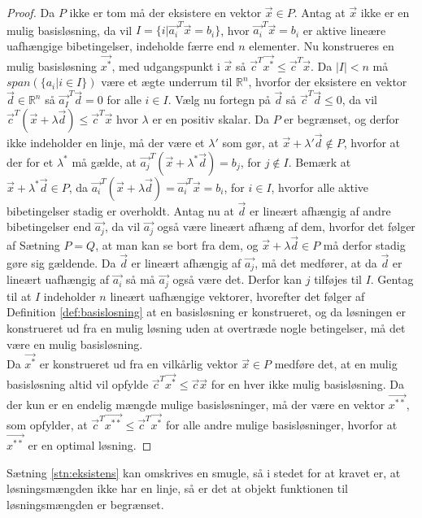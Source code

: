 \begin{proof}
Da $P$ ikke er tom må der eksistere en vektor $\vec{x} \in P$.
Antag at $\vec{x}$ ikke er en mulig basisløsning, da vil $I = \{i | \vec{a_i}^T\vec{x} = b_i\}$, hvor $\vec{a_i}^T\vec{x}=b_i$ er aktive lineære uafhængige bibetingelser, indeholde færre end $n$ elementer. 
Nu konstrueres en mulig basisløsning $\vec{x^*}$, med udgangspunkt i $\vec{x}$ så $\vec{c}^T\vec{x^*}\leq \vec{c}^T\vec{x}$.
Da $|I|<n $ må $span(\{a_i | i \in I\})$ være et ægte underrum til $\mathds{R}^n$, hvorfor der eksistere en vektor $\vec{d} \in \mathds{R}^n$ så $\vec{a_I}^T\vec{d}=0$ for alle $i \in I$. 
Vælg nu fortegn på $\vec{d}$ så $\vec{c}^T\vec{d} \leq 0$, da vil $\vec{c}^T(\vec{x}+\lambda\vec{d}) \leq \vec{c}^T\vec{x}$ hvor $\lambda$ er en positiv skalar.
Da $P$ er begrænset, og derfor ikke indeholder en linje, må der være et $\lambda'$ som gør, at $\vec{x}+\lambda'\vec{d} \notin P$, hvorfor at der for et $\lambda^*$ må gælde, at $\vec{a_j}^T(\vec{x}+\lambda^* \vec{d}) = b_j$, for $j \notin I$.
Bemærk at $\vec{x}+\lambda^*\vec{d} \in P$, da $\vec{a_i}^T(\vec{x}+\lambda\vec{d})= \vec{a_i}^T\vec{x} = b_i$, for $i \in I$, hvorfor alle aktive bibetingelser stadig er overholdt.
Antag nu at $\vec{d}$ er lineært afhængig af andre bibetingelser end $\vec{a_j}$, da vil $\vec{a_j}$ også være lineært afhæng af dem, hvorfor det følger af Sætning $P=Q$, at man kan se bort fra dem, og $\vec{x}+\lambda \vec{d} \in P$ må derfor stadig gøre sig gældende. 
Da $\vec{d}$ er lineært afhængig af $\vec{a_j}$, må det medfører, at da $\vec{d}$ er lineært uafhængig af $\vec{a_i}$ så må $\vec{a_j}$ også være det. 
Derfor kan $j$ tilføjes til $I$. 
Gentag til at $I$ indeholder $n$ lineært uafhængige vektorer, hvorefter det følger af Definition \ref{def:basislosning} at en basisløsning er konstrueret, og da løsningen er konstrueret ud fra en mulig løsning uden at overtræde nogle betingelser, må det være en mulig basisløsning.\\
Da $\vec{x^*}$ er konstrueret ud fra en vilkårlig vektor $\vec{x}\in P$ medføre det, at en mulig basisløsning altid vil opfylde $\vec{c}^T\vec{x^*} \leq \vec{c}\vec{x}$ for en hver ikke mulig basisløsning. 
Da der kun er en endelig mængde mulige basisløsninger, må der være en vektor $\vec{x^{**}}$, som opfylder, at $\vec{c}^T\vec{x^{**}}\leq \vec{c}^T\vec{x^*}$ for alle andre mulige basisløsninger, hvorfor at $\vec{x^{**}}$ er en optimal løsning.
\end{proof}
Sætning \ref{stn:eksistens} kan omskrives en smugle, så i stedet for at kravet er, at løsningsmængden ikke har en linje, så er det at objekt funktionen til løsningsmængden er begrænset.
